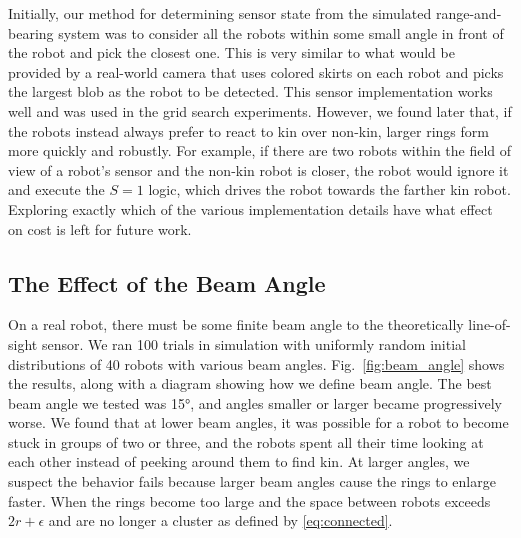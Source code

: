 \documentclass[letterpaper, 10 pt, conference]{ieeeconf}
\begin{document}
Initially, our method for determining sensor state from the simulated
range-and-bearing system was to consider all the robots within some small angle
in front of the robot and pick the closest one. This is very similar to what
would be provided by a real-world camera that uses colored skirts on each robot
and picks the largest blob as the robot to be detected. This sensor
implementation works well and was used in the grid search experiments. However,
we found later that, if the robots instead always prefer to react to kin over
non-kin, larger rings form more quickly and robustly. For example, if there are
two robots within the field of view of a robot's sensor and the non-kin robot is
closer, the robot would ignore it and execute the $S=1$ logic, which drives the
robot towards the farther kin robot. Exploring exactly which of the various
implementation details have what effect on cost is left for future work.

\subsection{The Effect of the Beam Angle} \label{sec:aperture_angle}

On a real robot, there must be some finite beam angle to the theoretically
line-of-sight sensor. We ran 100 trials in simulation with uniformly random
initial distributions of 40 robots with various beam
angles. Fig.~\ref{fig:beam_angle} shows the results, along with a diagram
showing how we define beam angle. The best beam angle we tested was \ang{15},
and angles smaller or larger became progressively worse. We found that at lower
beam angles, it was possible for a robot to become stuck in groups of two or
three, and the robots spent all their time looking at each other instead of
peeking around them to find kin. At larger angles, we suspect the behavior fails
because larger beam angles cause the rings to enlarge faster. When the rings become
too large and the space between robots exceeds $2r+\epsilon$
and are no longer a cluster as defined by \eqref{eq:connected}.
\end{document}
